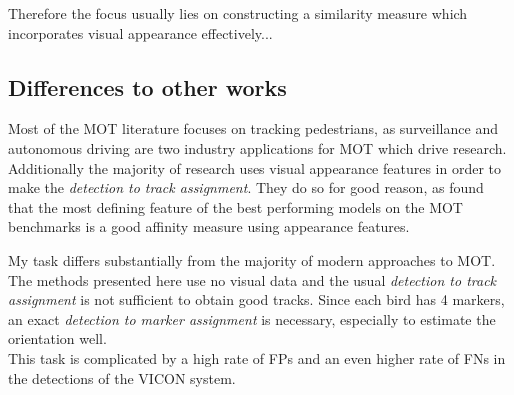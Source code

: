 \documentclass{article}
\begin{document}
Therefore the focus usually lies on constructing a similarity measure which incorporates visual appearance effectively...%

\subsection{Differences to other works}

Most of the MOT literature focuses on tracking pedestrians, as surveillance and autonomous driving are two industry applications for MOT which drive research. Additionally the majority of research uses visual appearance features in order to make the \emph{detection to track assignment}. They do so for good reason, as \cite{tracking_the_trackers} found that the most defining feature of the best performing models on the MOT benchmarks is a good affinity measure using appearance features.

My task differs substantially from the majority of modern approaches to MOT. The methods presented here use no visual data and the usual \emph{detection to track assignment} is not sufficient to obtain good tracks. Since each bird has 4 markers, an exact \emph{detection to marker assignment} is necessary, especially to estimate the orientation well. \\
This task is complicated by a high rate of FPs and an even higher rate of FNs in the detections of the VICON system. 
\end{document}
